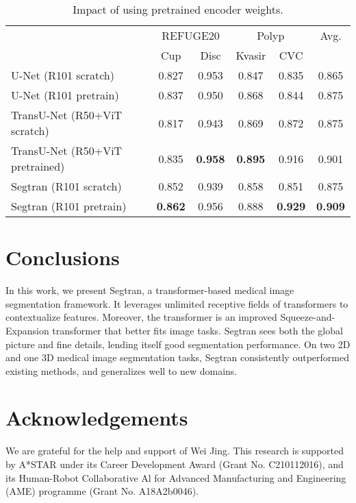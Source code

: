 \documentclass{article}
\begin{document}
\begin{table}[h]
\begin{centering}\setlength\tabcolsep{2pt}
\begin{tabular}{|m{3.3cm}|c|c|c|c|c|}
\hline 
& \multicolumn{2}{c|}{REFUGE20} & \multicolumn{2}{c|}{Polyp} & Avg.\tabularnewline
\cline{2-5} 
 & Cup & Disc & Kvasir & CVC & \tabularnewline
\hline 
U-Net (R101 scratch) & 0.827 & 0.953 & 0.847 & 0.835 & 0.865 \tabularnewline
\hline 
U-Net (R101 pretrain) & 0.837 & 0.950 & 0.868 & 0.844 & 0.875 \tabularnewline
\hline 
TransU-Net (R50+ViT scratch) & 0.817 & 0.943 & 0.869 & 0.872 & 0.875 \tabularnewline
\hline 
TransU-Net (R50+ViT pretrained) & 0.835 & \textbf{0.958} & \textbf{0.895} & 0.916 & 0.901 \tabularnewline
\hline 
Segtran (R101 scratch) & 0.852 & 0.939 & 0.858 & 0.851 & 0.875 \tabularnewline
\hline 
Segtran (R101 pretrain) & \textbf{0.862} & 0.956 & 0.888 & \textbf{0.929} & \textbf{0.909} \tabularnewline
\hline 
\end{tabular}
\caption{Impact of using pretrained encoder weights.} \label{pretraining}
\par
\end{centering}
\end{table}

\section{Conclusions}
In this work, we present Segtran, a transformer-based medical image segmentation framework. It leverages unlimited receptive fields of transformers to contextualize features. Moreover, the transformer is an improved Squeeze-and-Expansion transformer that better fits image tasks. Segtran sees both the global picture and fine details, lending itself good segmentation performance. On two 2D and one 3D medical image segmentation tasks, Segtran consistently outperformed existing methods, and generalizes well to new domains.


\section*{Acknowledgements}
We are grateful for the help and support of Wei Jing. This research is supported by A*STAR under its Career Development Award (Grant No. C210112016), and its Human-Robot Collaborative Al for Advanced Manufacturing and Engineering (AME) programme (Grant No. A18A2b0046).


{\small
}
\end{document}
